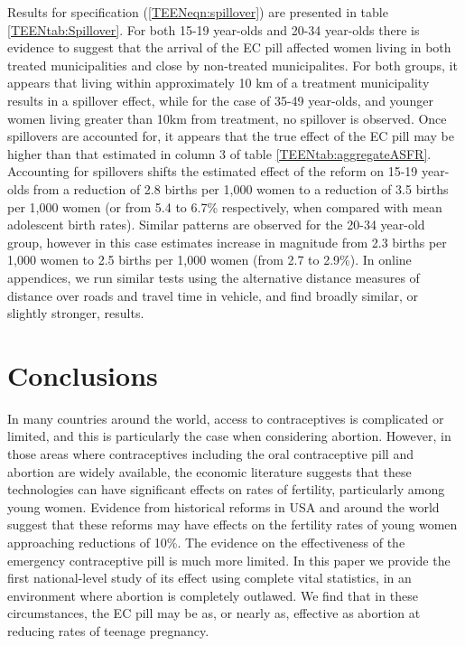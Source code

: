Results for specification (\ref{TEENeqn:spillover}) are presented in table
\ref{TEENtab:Spillover}. For both 15-19 year-olds and 20-34 year-olds there is
evidence to suggest that the arrival of the EC pill affected women living in
both treated municipalities and close by non-treated municipalites. For both groups,
it appears that living within approximately 10 km of a treatment municipality 
results in a spillover effect, while for the case of 35-49 year-olds, and younger
women living greater than 10km from treatment, no spillover is observed.  Once
spillovers are accounted for, it appears that the true effect of the EC pill may
be higher than that estimated in column 3 of table \ref{TEENtab:aggregateASFR}.
Accounting for spillovers shifts the estimated effect of the reform on 15-19
year-olds from a reduction of 2.8 births per 1,000 women to a reduction of 3.5
births per 1,000 women (or from 5.4 to 6.7\% respectively, when compared with
mean adolescent birth rates).  Similar patterns are observed for the 20-34
year-old group, however in this case estimates increase in magnitude from 2.3
births per 1,000 women to 2.5 births per 1,000 women (from 2.7 to 2.9\%). In
online appendices, we run similar tests using the alternative distance measures
of distance over roads and travel time in vehicle, and find broadly similar, or
slightly stronger, results.

\section{Conclusions}
\label{TEENscn:conclusion}
In many countries around the world, access to contraceptives is complicated or
limited, and this is particularly the case when considering abortion.  However,
in those areas where contraceptives including the oral contraceptive pill and 
abortion are widely available, the economic literature suggests that these
technologies can have significant effects on rates of fertility, particularly
among young women.  Evidence from historical reforms in USA and around the world
suggest that these reforms may have effects on the fertility rates of young women 
approaching reductions of 10\%.  The evidence on the effectiveness of the
emergency contraceptive pill is much more limited.  In this paper we provide the
first national-level study of its effect using complete vital statistics, in an
environment where abortion is completely outlawed. We find that in these
circumstances, the EC pill may be as, or nearly as, effective as abortion at
reducing rates of teenage pregnancy.

